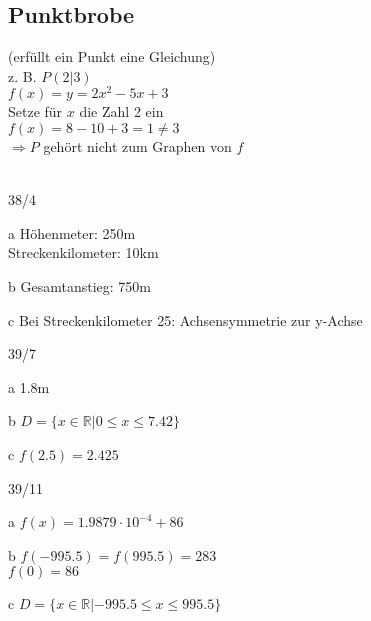 \subsection{Punktbrobe}
(erfüllt ein Punkt eine Gleichung) \\
z. B. $P(2|3)$ \\
$f(x) = y = 2x^2 - 5x + 3$ \\
Setze für $x$ die Zahl 2 ein \\
$f(x) = 8 - 10 + 3 = 1 \neq 3$ \\
$\Rightarrow P$ gehört nicht zum Graphen von $f$ \\\\
\begin{onepage}
  \begin{exercise}{38/4}
    \item [a]
    Höhenmeter: 250m \\
    Streckenkilometer: 10km
    \item [b]
    Gesamtanstieg: 750m
    \item [c]
    Bei Streckenkilometer 25: Achsensymmetrie zur y-Achse
  \end{exercise}
\end{onepage}
\begin{onepage}
  \begin{exercise}{39/7}
    \item [a]
    1.8m
    \item [b]
    $D = \{x \in \mathbb{R} | 0 \leq x \leq 7.42\}$
    \item [c]
    $f(2.5) = 2.425$
  \end{exercise}
\end{onepage}
\begin{onepage}
  \begin{exercise}{39/11}
    \item [a]
    $f(x) = 1.9879 \cdot 10^{-4} + 86$
    \item [b]
    $f(-995.5) = f(995.5) = 283$ \\
    $f(0) = 86$
    \item [c]
    $D = \{x \in \mathbb{R} | -995.5 \leq x \leq 995.5\}$
  \end{exercise}
\end{onepage}

